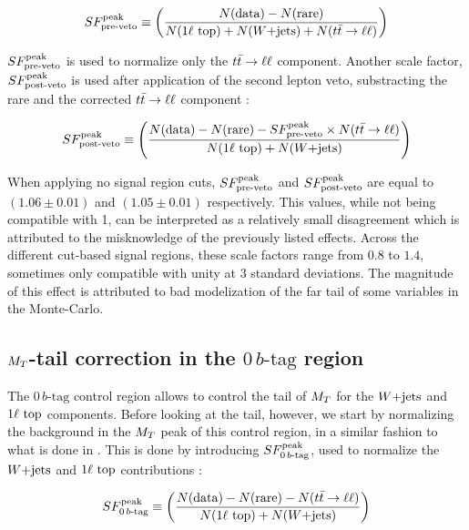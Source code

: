     \begin{equation}
        SF_{\text{pre-veto}}^{\text{peak}} \equiv \left( \frac{N(\text{data}) - N(\text{rare})}{N(1\ell~\text{top}) + N(\text{$W$+jets}) + N(t\bar{t} \rightarrow \ell \ell)} \right)
        \label{eq:SFpreDefinition}
    \end{equation}

    $SF_{\text{pre-veto}}^{\text{peak}}$ is used to normalize only the $t\bar{t} \rightarrow \ell \ell$ component. Another scale factor,
    $SF_{\text{post-veto}}^{\text{peak}}$ is used after application of the second lepton veto, substracting the rare
    and the corrected $t\bar{t} \rightarrow \ell \ell$ component :

    \begin{equation}
        SF_{\text{post-veto}}^{\text{peak}} \equiv \left( \frac{N(\text{data}) - N(\text{rare}) - SF_{\text{pre-veto}}^{\text{peak}} \times N(t\bar{t} \rightarrow \ell \ell)}{N(1\ell~\text{top}) + N(\text{$W$+jets})} \right)
        \label{eq:SFpostDefinition}
    \end{equation}

     When applying no signal region cuts, $SF_{\text{pre-veto}}^{\text{peak}}$ and $SF_{\text{post-veto}}^{\text{peak}}$ are equal to
     $(1.06 \pm 0.01)$ and $(1.05 \pm 0.01)$ respectively. This values, while not
     being compatible with 1, can be interpreted as a relatively small disagreement
     which is attributed to the misknowledge of the previously listed effects. Across the
     different cut-based signal regions, these scale factors range from $0.8$ to $1.4$,
     sometimes only compatible with unity at 3 standard deviations. The magnitude of this
     effect is attributed to bad modelization of the far tail of some variables in the
     Monte-Carlo.

        \subsection{$M_T$-tail correction in the $0\, b\text{-tag}$ region \label{sec:MTtailCorrection}}

    The $0\, b\text{-tag}$ control region allows to control the tail of $M_T$ for the $\text{$W$+jets}$ and
    $1\ell~\text{top}$ components. Before looking at the tail, however, we start by normalizing
    the background in the $M_T$ peak of this control region, in a similar fashion to what
    is done in . This is done by introducing $SF_{0\, b\text{-tag}}^{\text{peak}}$,
    used to normalize the $\text{$W$+jets}$ and $1\ell~\text{top}$ contributions :

    \begin{equation}
        SF_{0\, b\text{-tag}}^{\text{peak}} \equiv \left( \frac{N(\text{data}) - N(\text{rare}) - N(t\bar{t} \rightarrow \ell \ell)}{N(1\ell~\text{top}) + N(\text{$W$+jets})} \right)
        \label{eq:SF0btagDefinition}
    \end{equation}

